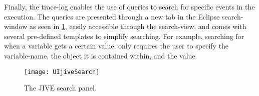 Finally, the trace-log enables the use of queries to search for specific events in the execution.
The queries are presented through a new tab in the Eclipse search-window as seen in \cref{fig:UIjiveSearchPanel}, easily accessible through the search-view, and comes with several pre-defined templates to simplify searching.
For example, searching for when a variable gets a certain value, only requires the user to specify the variable-name, the object it is contained within, and the value.
\begin{figure}[H]
	\centering
	\texttt{[image: UIjiveSearch]}
	\caption{The JIVE search panel.}
	\label{fig:UIjiveSearchPanel}
\end{figure}

